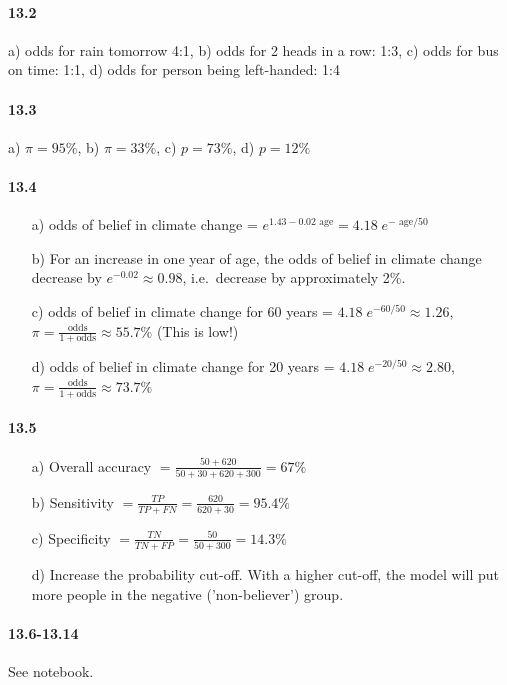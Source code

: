\documentclass[fontsize=11pt,DIV=18,parskip=half]{scrartcl}
\begin{document}
\paragraph{13.2} a) odds for rain tomorrow 4:1, b) odds for 2 heads in a row: 1:3, c) odds for bus on time: 1:1, d) odds for person being left-handed: 1:4

\paragraph{13.3} a) $\pi = 95\%$, b) $\pi = 33\%$, c) $p = 73\%$, d) $p = 12\%$

\paragraph{13.4}
\begin{itemize}
\item[a)] odds of belief in climate change = $e^{1.43 - 0.02 \text{ age}} = 4.18 \; e^{-\text{ age}/50}$
\item[b)] For an increase in one year of age, the odds of belief in climate change decrease by $e^{-0.02} \approx 0.98$, i.e.\ decrease by approximately 2\%.
\item[c)] odds of belief in climate change for 60 years = $4.18 \; e^{-60/50} \approx 1.26$, \; $\pi = \frac{\text{odds}}{1+\text{odds}} \approx 55.7\%$ (This is low!)
\item[d)] odds of belief in climate change for 20 years = $4.18 \; e^{-20/50} \approx 2.80$, \; $\pi = \frac{\text{odds}}{1+\text{odds}} \approx 73.7\%$
\end{itemize}

\paragraph{13.5}
\begin{itemize}
\item[a)] Overall accuracy $ = \frac{50+620}{50+30+620+300} = 67\%$
\item[b)] Sensitivity $= \frac{TP}{TP + FN} = \frac{620}{620 + 30} = 95.4\%$ 
\item[c)] Specificity $= \frac{TN}{TN + FP} = \frac{50}{50 + 300} = 14.3\%$ 
\item[d)] Increase the probability cut-off. With a higher cut-off, the model will put more people in the negative ('non-believer') group.
\end{itemize}

\paragraph{13.6-13.14} See notebook.
\end{document}
